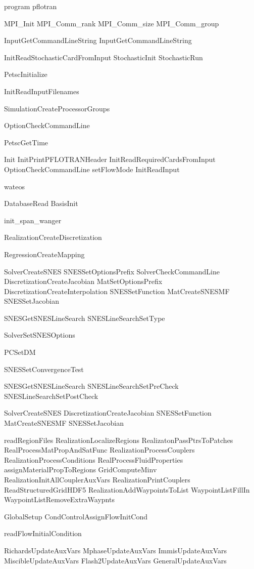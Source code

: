 program pflotran

	MPI_Init
	MPI_Comm_rank
	MPI_Comm_size
	MPI_Comm_group

	InputGetCommandLineString
	InputGetCommandLineString

	InitReadStochasticCardFromInput
	StochasticInit
	StochasticRun

	PetscInitialize

	InitReadInputFilenames

	SimulationCreateProcessorGroups

	OptionCheckCommandLine

	PetscGetTime

	Init
		InitPrintPFLOTRANHeader
		InitReadRequiredCardsFromInput
		OptionCheckCommandLine
		setFlowMode
		InitReadInput
		
		wateos
		
		DatabaseRead
		BasisInit
		
		init_span_wanger
		
		RealizationCreateDiscretization
		
		RegressionCreateMapping
		
		SolverCreateSNES
		SNESSetOptionsPrefix
		SolverCheckCommandLine
		DiscretizationCreateJacobian
		MatSetOptionsPrefix
		DiscretizationCreateInterpolation
		SNESSetFunction
		MatCreateSNESMF
		SNESSetJacobian
		
		SNESGetSNESLineSearch
		SNESLineSearchSetType
		
		SolverSetSNESOptions
		
		PCSetDM
		
		SNESSetConvergenceTest
		
		SNESGetSNESLineSearch
		SNESLineSearchSetPreCheck
		SNESLineSearchSetPostCheck
		
		SolverCreateSNES
		DiscretizationCreateJacobian
		SNESSetFunction
		MatCreateSNESMF
		SNESSetJacobian
		
		readRegionFiles
		RealizationLocalizeRegions
		RealizatonPassPtrsToPatches
		RealProcessMatPropAndSatFunc
		RealizationProcessCouplers
		RealizationProcessConditions
		RealProcessFluidProperties
		assignMaterialPropToRegions
		GridComputeMinv
		RealizationInitAllCouplerAuxVars
		RealizationPrintCouplers
		ReadStructuredGridHDF5
		RealizationAddWaypointsToList
		WaypointListFillIn
		WaypointListRemoveExtraWaypnts
		
		GlobalSetup
		CondControlAssignFlowInitCond
		
		readFlowInitialCondition
		
		RichardsUpdateAuxVars
		MphaseUpdateAuxVars
		ImmisUpdateAuxVars
		MiscibleUpdateAuxVars
		Flash2UpdateAuxVars
		GeneralUpdateAuxVars
		
